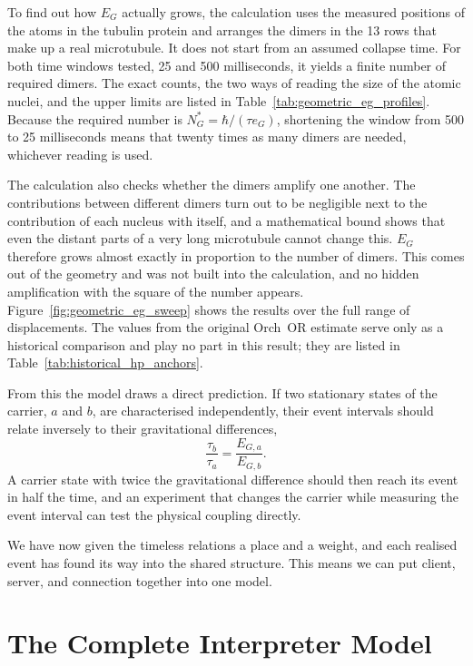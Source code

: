 To find out how $E_G$ actually grows, the calculation uses the measured positions of
the atoms in the tubulin protein and arranges the dimers in the 13 rows that make up a
real microtubule. It does not start from an assumed collapse time. For both time
windows tested, 25 and 500 milliseconds, it yields a finite number of required dimers.
The exact counts, the two ways of reading the size of the atomic nuclei, and the upper
limits are listed in Table~\ref{tab:geometric_eg_profiles}. Because the required
number is $N_G^*=\hbar/(\tau e_G)$, shortening the window from 500 to 25 milliseconds
means that twenty times as many dimers are needed, whichever reading is used.

The calculation also checks whether the dimers amplify one another. The contributions
between different dimers turn out to be negligible next to the contribution of each
nucleus with itself, and a mathematical bound shows that even the distant parts of a
very long microtubule cannot change this. $E_G$ therefore grows almost exactly in
proportion to the number of dimers. This comes out of the geometry and was not
built into the calculation, and no hidden amplification with the square of the number
appears. Figure~\ref{fig:geometric_eg_sweep} shows the results over the full range of
displacements. The values from the original Orch~OR estimate \citep{hameroff2014}
serve only as a historical comparison and play no part in this result; they are
listed in Table~\ref{tab:historical_hp_anchors}.

From this the model draws a direct prediction. If two stationary states of the
carrier, $a$ and $b$, are characterised independently, their event intervals should
relate inversely to their gravitational differences,
\begin{equation}
  \frac{\tau_b}{\tau_a}=\frac{E_{G,a}}{E_{G,b}}.
  \label{eq:or_ratio_test}
\end{equation}
A carrier state with twice the gravitational difference should then reach its event
in half the time, and an experiment that changes the carrier while measuring the event
interval can test the physical coupling directly.

We have now given the timeless relations a place and a weight, and each realised event
has found its way into the shared structure. This means we can put client, server, and
connection together into one model.

\section{The Complete Interpreter Model}
\label{sec:model_glance}

